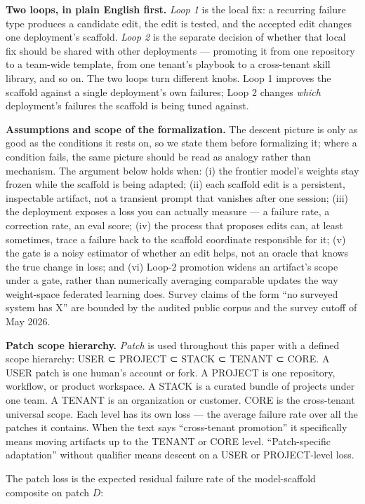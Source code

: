 \documentclass[
]{article}
\begin{document}
\textbf{Two loops, in plain English first.} \emph{Loop 1} is the local
fix: a recurring failure type produces a candidate edit, the edit is
tested, and the accepted edit changes one deployment's scaffold.
\emph{Loop 2} is the separate decision of whether that local fix should
be shared with other deployments --- promoting it from one repository to
a team-wide template, from one tenant's playbook to a cross-tenant skill
library, and so on. The two loops turn different knobs. Loop 1 improves
the scaffold against a single deployment's own failures; Loop 2 changes
\emph{which} deployment's failures the scaffold is being tuned against.

\textbf{Assumptions and scope of the formalization.} The descent picture
is only as good as the conditions it rests on, so we state them before
formalizing it; where a condition fails, the same picture should be read
as analogy rather than mechanism. The argument below holds when: (i) the
frontier model's weights stay frozen while the scaffold is being
adapted; (ii) each scaffold edit is a persistent, inspectable artifact,
not a transient prompt that vanishes after one session; (iii) the
deployment exposes a loss you can actually measure --- a failure rate, a
correction rate, an eval score; (iv) the process that proposes edits
can, at least sometimes, trace a failure back to the scaffold coordinate
responsible for it; (v) the gate is a noisy estimator of whether an edit
helps, not an oracle that knows the true change in loss; and (vi) Loop-2
promotion widens an artifact's scope under a gate, rather than
numerically averaging comparable updates the way weight-space federated
learning does. Survey claims of the form ``no surveyed system has X''
are bounded by the audited public corpus and the survey cutoff of May
2026.

\textbf{Patch scope hierarchy.} \emph{Patch} is used throughout this
paper with a defined scope hierarchy: USER ⊂ PROJECT ⊂ STACK ⊂ TENANT ⊂
CORE. A USER patch is one human's account or fork. A PROJECT is one
repository, workflow, or product workspace. A STACK is a curated bundle
of projects under one team. A TENANT is an organization or customer.
CORE is the cross-tenant universal scope. Each level has its own loss
--- the average failure rate over all the patches it contains. When the
text says ``cross-tenant promotion'' it specifically means moving
artifacts up to the TENANT or CORE level. ``Patch-specific adaptation''
without qualifier means descent on a USER or PROJECT-level loss.

The patch loss is the expected residual failure rate of the
model-scaffold composite on patch \(D\):
\end{document}

